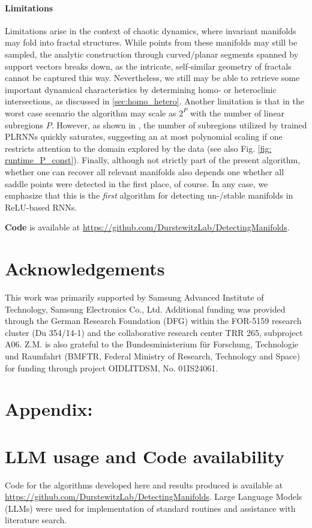 \documentclass{article}
\theoremstyle{example}
\theoremstyle{plain}
\theoremstyle{definition}
\theoremstyle{remark}
\begin{document}
\paragraph{Limitations}
Limitations arise in the context of chaotic dynamics, where invariant manifolds may fold into fractal structures. While points from these manifolds may still be sampled, the analytic construction through curved/planar segments spanned by support vectors breaks down, as the intricate, self-similar geometry of fractals cannot be captured this way. Nevertheless, we still may be able to retrieve some important dynamical characteristics by determining homo- or heteroclinic intersections, as discussed in \cref{sec:homo_hetero}. Another limitation is that in the worst case scenario the algorithm may scale as $2^P$ with the number of linear subregions $P$. However, as shown in \citep{brenner2024alrnn}, the number of subregions utilized by trained PLRNNs quickly saturates, suggesting an at most polynomial scaling if one restricts attention to the domain explored by the data (see also Fig. \ref{fig: runtime_P_const}). Finally, although not strictly part of the present algorithm, whether one can recover all relevant manifolds also depends one whether all saddle points were detected in the first place, of course. In any case, we emphasize that this is the \textit{first} algorithm for detecting un-/stable manifolds in ReLU-based RNNs.

\textbf{Code} is available at \url{https://github.com/DurstewitzLab/DetectingManifolds}.

\section{Acknowledgements}
This work was primarily supported by Samsung Advanced Institute of Technology, Samsung Electronics Co., Ltd. Additional funding was provided through the German Research Foundation (DFG) within the FOR-5159 research cluster (Du 354/14-1) and the collaborative research center TRR 265, subproject A06. Z.M. is also grateful to the Bundesministerium für Forschung, Technologie und Raumfahrt (BMFTR, Federal
Ministry of Research, Technology and Space) for funding through project OIDLITDSM, No. 01IS24061.


\newpage
\onecolumn
\newpage
\appendix
\section*{Appendix:}\label{app}
\section{LLM usage and Code availability}
Code for the algorithms developed here and results produced is available at \url{https://github.com/DurstewitzLab/DetectingManifolds}. 
Large Language Models (LLMs) were used for implementation of standard routines and assistance with literature search.
\end{document}
